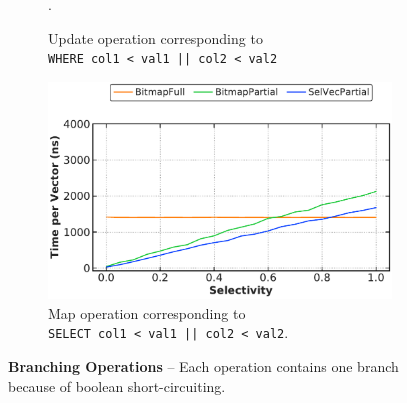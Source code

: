 \documentclass[12pt]{cmuthesis}
\begin{document}
\begin{figure}[t!]
\begin{subfigure}[t]{.49\linewidth}
 \caption{Update operation corresponding to \\ \texttt{\footnotesize WHERE col1 < val1 || col2 < val2}}.
  \label{fig:logical_or_update}
\end{subfigure}%
\begin{subfigure}[t]{.49\linewidth}
 \centering
 \includegraphics[width=0.9\linewidth]{eval/logical_or_map.pdf}
 \caption{Map operation corresponding to \\ \texttt{\footnotesize SELECT col1 < val1 || col2 < val2}.}
  \label{fig:logical_or_map}
\end{subfigure}

\caption{\textbf{Branching Operations} -- Each operation contains one branch because of boolean short-circuiting.}
\label{fig:logical_map_update}
\end{figure}
\end{document}
